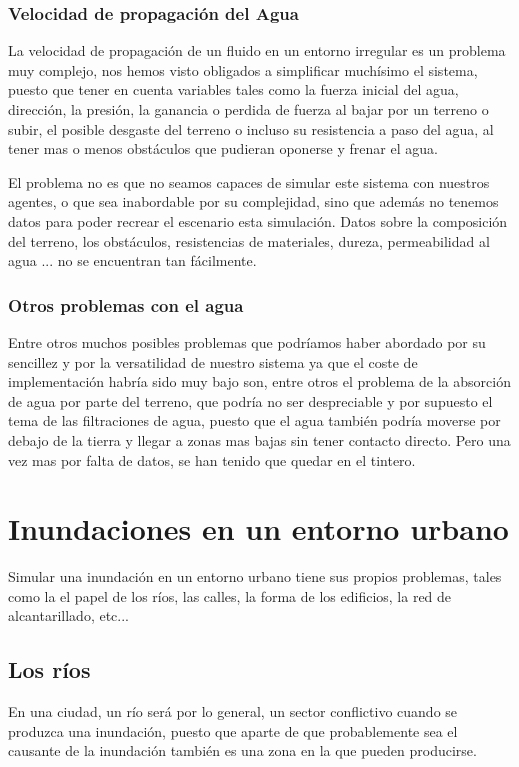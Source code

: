 \subsubsection*{Velocidad de propagación del Agua}

La velocidad de propagación de un fluido en un entorno irregular es un problema
muy complejo, nos hemos visto 
obligados a simplificar muchísimo el sistema,
puesto que tener en cuenta
variables tales como la fuerza inicial del agua, dirección, la presión, la
ganancia o perdida de fuerza al bajar por un terreno o subir, el posible
desgaste del terreno o incluso su resistencia a paso del agua, al tener mas o
menos obstáculos que pudieran oponerse y frenar el agua. 

El problema no es que no seamos capaces de simular este sistema con nuestros
agentes, o que sea inabordable por su complejidad, sino que además no tenemos 
datos para poder recrear el escenario
esta simulación. Datos sobre la composición del terreno, los obstáculos,
resistencias de materiales, dureza, permeabilidad al agua ... no se encuentran
tan fácilmente.

\subsubsection*{Otros problemas con el agua}

Entre otros muchos posibles problemas que podríamos haber abordado por su
sencillez y por la versatilidad de nuestro sistema ya que el coste de
implementación habría sido muy bajo son, entre otros el problema de la absorción
de agua por parte del terreno, que podría no ser despreciable y por supuesto el
tema de las filtraciones de agua, puesto que el agua también podría moverse por
debajo de la tierra y llegar a zonas mas bajas sin tener contacto directo. Pero
una vez mas por falta de datos, se han tenido que quedar en el tintero.


\section*{Inundaciones en un entorno urbano}

Simular una inundación en un entorno urbano tiene sus propios problemas, tales
como la el papel de los ríos, las calles, la forma de los edificios, la red de
alcantarillado, etc... \cite{simulator, katrina}
\subsection*{Los ríos}
En una ciudad, un río será por lo general, un sector conflictivo cuando se
produzca una inundación, puesto que aparte de que probablemente sea el causante
de la inundación  también es una zona en la que pueden producirse.

